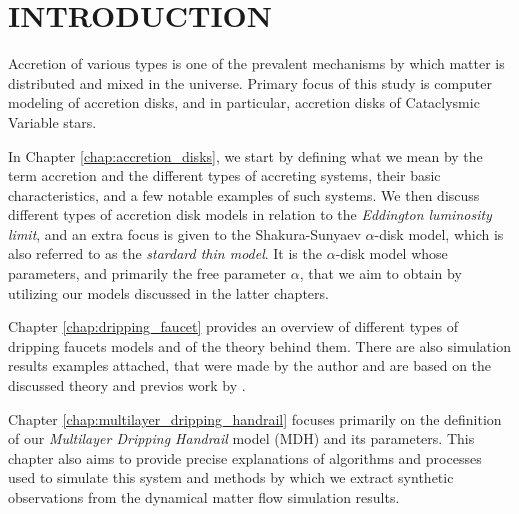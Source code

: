 \chapter{INTRODUCTION}
\thispagestyle{empty}


Accretion of various types is one of the prevalent mechanisms by which matter is distributed and mixed in the universe. Primary focus of this study is computer modeling of accretion disks, and in particular, accretion disks of Cataclysmic Variable stars.

In Chapter \ref{chap:accretion_disks}, we start by defining what we mean by the term accretion and the different types of accreting systems, their basic characteristics, and a few notable examples of such systems. We then discuss different types of accretion disk models in relation to the \emph{Eddington luminosity limit}, and an extra focus is given to the Shakura-Sunyaev $\alpha$-disk model, which is also referred to as the \emph{stardard thin model}. It is the $\alpha$-disk model whose parameters, and primarily the free parameter $\alpha$, that we aim to obtain by utilizing our models discussed in the latter chapters.



Chapter \ref{chap:dripping_faucet} provides an overview of different types of dripping faucets models and of the theory behind them. There are also simulation results examples attached, that were made by the author and are based on the discussed theory and previos work by \citep{kveton2014}. \citep{kveton2014} 

Chapter \ref{chap:multilayer_dripping_handrail} focuses primarily on the definition of our \emph{Multilayer Dripping Handrail} model (MDH) and its parameters. This chapter also aims to provide precise explanations of algorithms and processes used to simulate this system and methods by which we extract synthetic observations from the dynamical matter flow simulation results.




